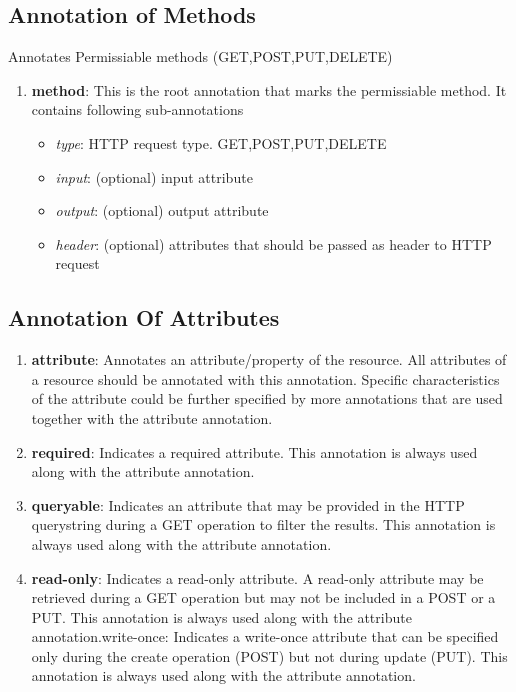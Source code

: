 \begin{spacing}{1.5}
\subsection{Annotation of Methods}
Annotates Permissiable methods (GET,POST,PUT,DELETE)

\begin{enumerate}
\item {\bf method}: This is the root annotation that marks the permissiable method. It contains following sub-annotations
\begin{itemize}
\item {\it type}: HTTP request type. GET,POST,PUT,DELETE
\item {\it input}:  (optional) input attribute
\item {\it output}: (optional) output attribute
\item {\it header}: (optional) attributes that should be passed as header to HTTP request
\end{itemize}
\end{enumerate}

\subsection{Annotation Of Attributes}
\begin{enumerate}
\item {\bf attribute}: Annotates an attribute/property of the resource. All attributes of a resource should be annotated with this annotation. Specific characteristics of the attribute could be further specified by more annotations that are used together with the attribute annotation.

\item {\bf required}: Indicates a required attribute. This annotation is always used along with the attribute annotation.

\item {\bf queryable}:  Indicates an attribute that may be provided in the HTTP querystring during a GET operation to filter the results. This annotation is always used along with the attribute annotation.

\item {\bf read-only}:  Indicates a read-only attribute. A read-only attribute may be retrieved during a GET operation but may not be included in a POST or a PUT. This annotation is always used along with the attribute annotation.write-once: Indicates a write-once attribute that can be specified only during the create operation (POST) but not during update (PUT). This annotation is always used along with the attribute annotation.


\end{enumerate}
\end{spacing}

